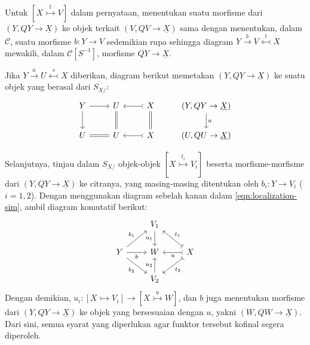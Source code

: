\begin{bukti}
	Untuk $[X \stackrel{t}{\rightarrowtail} V]$ dalam pernyataan, menentukan
	suatu morfisme dari $(Y, QY \to \underline{X})$ ke objek terkait
	$(V, QV \to \underline{X})$ sama dengan menentukan, dalam
	$\mathcal{C}$, suatu morfisme $b: Y \to V$ sedemikian rupa sehingga
	diagram $Y \xrightarrow{b} V \stackrel{t}{\leftarrowtail} X$ mewakili,
	dalam $\mathcal{C}[S^{-1}]$, morfisme $QY \to \underline{X}$.

	Jika $Y \xrightarrow{a} U \stackrel{s}{\leftarrowtail} X$ diberikan,
	diagram berikut memetakan $(Y, QY \to \underline{X})$ ke suatu objek yang
	berasal dari $S_{X/}$:
	\begin{equation*}\begin{tikzcd}
		Y \arrow[r] \arrow[d] & U \arrow[equal, d] & X \arrow[rightarrowtail, l] \arrow[equal, d] & (Y, QY \to \underline{X}) \arrow[d, "a"] \\
		U \arrow[equal, r] & U & X \arrow[rightarrowtail, l] & (U, QU \to \underline{X})
	\end{tikzcd}\end{equation*}

	Selanjutnya, tinjau dalam $S_{X/}$ objek-objek
	$[X \stackrel{t_i}{\rightarrowtail} V_i]$ beserta
	morfisme-morfisme dari $(Y, QY \to \underline{X})$ ke citranya, yang
	masing-masing ditentukan oleh $b_i: Y \to V_i$ ($i=1, 2$). Dengan
	menggunakan diagram sebelah kanan dalam \eqref{eqn:localization-sim}, ambil
	diagram komutatif berikut:
	\[\begin{tikzcd}
		& V_1 \arrow[d, "{u_1}"'] & \\
		Y \arrow[r, "b"'] \arrow[ru, "{b_1}"] \arrow[rd, "{b_2}"'] & W & X \arrow[rightarrowtail, l, "u"] \arrow[rightarrowtail, lu, "{t_1}"'] \arrow[rightarrowtail, ld, "{t_2}"] \\
		& V_2 \arrow[u, "{u_2}"] &
	\end{tikzcd}\]
	Dengan demikian,
	$u_i: [X \rightarrowtail V_i] \to [X \stackrel{u}{\rightarrowtail} W]$,
	dan $b$ juga menentukan morfisme dari $(Y, QY \to \underline{X})$ ke
	objek yang bersesuaian dengan $u$, yakni
	$(W, QW \to \underline{X})$. Dari sini,
	semua syarat yang diperlukan agar funktor tersebut kofinal segera
	diperoleh.
\end{bukti}

